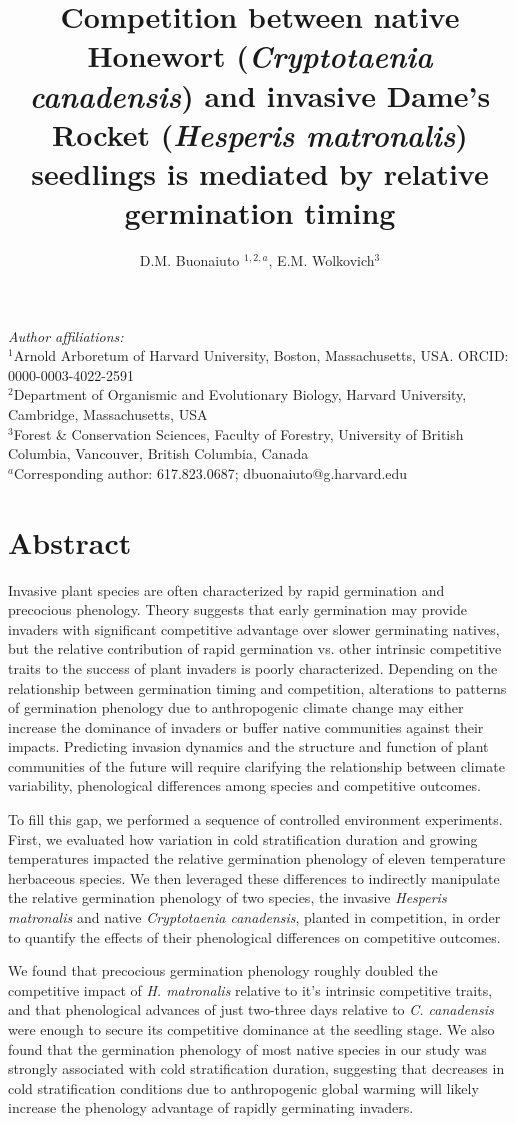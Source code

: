 \documentclass{article}\usepackage[]{graphicx}\usepackage[]{color}
\title{Competition between native Honewort (\textit{Cryptotaenia canadensis}) and invasive Dame's Rocket (\textit{Hesperis matronalis}) seedlings is mediated by relative germination timing}
\author{D.M. Buonaiuto $^{1,2,a}$, E.M. Wolkovich$^{3}$}
\begin{document}
\maketitle
\noindent \emph{Author affiliations:}\\
\noindent $^1$Arnold Arboretum of Harvard University, Boston, Massachusetts, USA. ORCID: 0000-0003-4022-2591\\
$^2$Department of Organismic and Evolutionary Biology, Harvard University, Cambridge, Massachusetts, USA \\
$^3$Forest \& Conservation Sciences, Faculty of Forestry, University of British Columbia, Vancouver, British Columbia, Canada\\
$^a$Corresponding author: 617.823.0687; dbuonaiuto@g.harvard.edu\\
\pagebreak
\section*{Abstract}
Invasive plant species are often characterized by rapid germination and precocious phenology. Theory suggests that early germination may provide invaders with significant competitive advantage over slower germinating natives, but the relative contribution of rapid germination vs. other intrinsic competitive traits to the success of plant invaders is poorly characterized. Depending on the relationship between germination timing and competition, alterations to patterns of germination phenology due to anthropogenic climate change may either increase the dominance of invaders or buffer native communities against their impacts. Predicting invasion dynamics and the structure and function of plant communities of the future will require clarifying the relationship between climate variability, phenological differences among species and competitive outcomes.

To fill this gap, we performed a sequence of controlled environment experiments. First, we evaluated how variation in cold stratification duration and growing temperatures impacted the relative germination phenology of eleven temperature herbaceous species. We then leveraged these differences to indirectly manipulate the relative germination phenology of two species, the invasive \textit{Hesperis matronalis} and native \textit{Cryptotaenia canadensis}, planted in competition, in order to quantify the effects of their phenological differences on competitive outcomes.

We found that precocious germination phenology roughly doubled the competitive impact of \textit{H. matronalis} relative to it's intrinsic competitive traits, and that phenological advances of just two-three days relative to \textit{C. canadensis} were enough to secure its competitive dominance at the seedling stage. We also found that the germination phenology of most native species in our study was strongly associated with cold stratification duration, suggesting that decreases in cold stratification conditions due to anthropogenic global warming will likely increase the phenology advantage of rapidly germinating invaders. 
\end{document}
